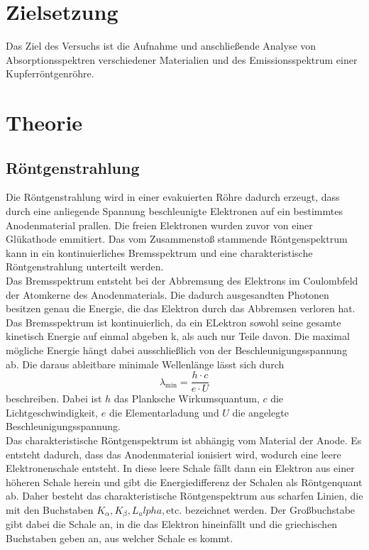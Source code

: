 \section{Zielsetzung}
\label{sec:Zielsetzung}
Das Ziel des Versuchs ist die Aufnahme und anschließende Analyse von Absorptionsspektren verschiedener Materialien und des Emissionsspektrum einer 
Kupferröntgenröhre.
\section{Theorie}
\label{sec:Theorie}
\subsection{Röntgenstrahlung}
Die Röntgenstrahlung wird in einer evakuierten Röhre dadurch erzeugt, dass durch eine anliegende Spannung beschleunigte Elektronen auf ein bestimmtes Anodenmaterial prallen. Die freien Elektronen
wurden zuvor von einer Glükathode emmitiert. Das vom Zusammenstoß stammende Röntgenspektrum kann in ein kontinuierliches Bremsspektrum und eine charakteristische 
Röntgenstrahlung unterteilt werden. \\
Das Bremsspektrum entsteht bei der Abbremsung des Elektrons im Coulombfeld der Atomkerne des Anodenmaterials. Die dadurch ausgesandten Photonen besitzen genau die 
Energie, die das Elektron durch das Abbremsen verloren hat. Das Bremsspektrum ist kontinuierlich, da ein ELektron sowohl seine gesamte kinetisch Energie auf einmal abgeben
k, als auch nur Teile davon. Die maximal mögliche Energie hängt dabei ausschließlich von der Beschleunigungsspannung ab. Die daraus ableitbare minimale Wellenlänge lässt
sich durch 
\begin{equation}
    \lambda_{\text{min}} = \frac{h \cdot c}{e \cdot U}
\end{equation}
beschreiben. Dabei ist $h$ das Planksche Wirkumsquantum, $c$ die Lichtgeschwindigkeit, $e$ die Elementarladung und $U$ die angelegte Beschleunigungsspannung.\\
Das charakteristische Röntgenspektrum ist abhängig vom Material der Anode. Es entsteht dadurch, dass das Anodenmaterial ionisiert wird, wodurch eine leere 
Elektronenschale entsteht. In diese leere Schale fällt dann ein Elektron aus einer höheren Schale herein und gibt die Energiedifferenz der Schalen als Röntgenquant 
ab. Daher besteht das charakteristische Röntgenspektrum aus scharfen Linien, die mit den Buchstaben $K_\alpha, K_\beta, L_alpha, \text{etc.}$ bezeichnet werden. Der
Großbuchstabe gibt dabei die Schale an, in die das Elektron hineinfällt und die griechischen Buchstaben geben an, aus welcher Schale es kommt. \\
